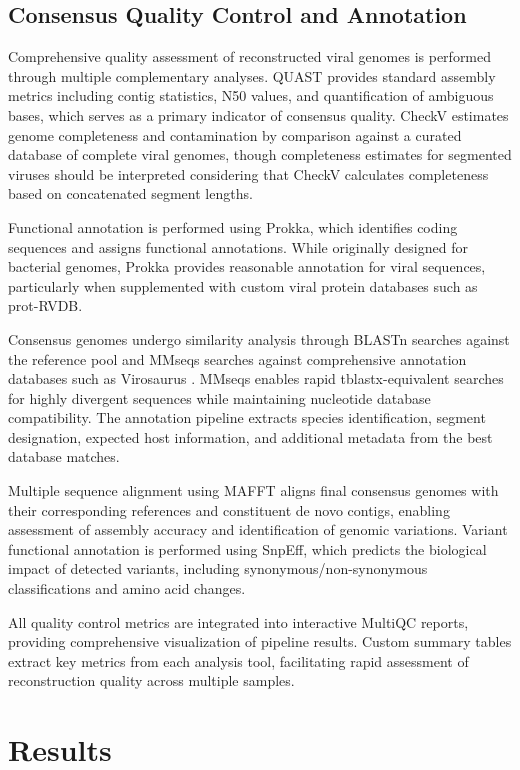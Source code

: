 \documentclass[unnumsec,webpdf,contemporary,large]{oup-authoring-template}%
\theoremstyle{thmstyleone}%
\theoremstyle{thmstyletwo}%
\theoremstyle{thmstylethree}%
\begin{document}
\subsection{Consensus Quality Control and Annotation}\label{subsec_qc}

Comprehensive quality assessment of reconstructed viral genomes is performed through multiple complementary analyses. QUAST provides standard assembly metrics including contig statistics, N50 values, and quantification of ambiguous bases, which serves as a primary indicator of consensus quality. CheckV \cite{Nayfach2021-wl} estimates genome completeness and contamination by comparison against a curated database of complete viral genomes, though completeness estimates for segmented viruses should be interpreted considering that CheckV calculates completeness based on concatenated segment lengths.

Functional annotation is performed using Prokka, which identifies coding sequences and assigns functional annotations. While originally designed for bacterial genomes, Prokka provides reasonable annotation for viral sequences, particularly when supplemented with custom viral protein databases such as prot-RVDB.

Consensus genomes undergo similarity analysis through BLASTn searches against the reference pool and MMseqs searches against comprehensive annotation databases such as Virosaurus \cite{Gleizes2020-rq}. MMseqs enables rapid tblastx-equivalent searches for highly divergent sequences while maintaining nucleotide database compatibility. The annotation pipeline extracts species identification, segment designation, expected host information, and additional metadata from the best database matches.

Multiple sequence alignment using MAFFT aligns final consensus genomes with their corresponding references and constituent de novo contigs, enabling assessment of assembly accuracy and identification of genomic variations. Variant functional annotation is performed using SnpEff, which predicts the biological impact of detected variants, including synonymous/non-synonymous classifications and amino acid changes.

All quality control metrics are integrated into interactive MultiQC reports, providing comprehensive visualization of pipeline results. Custom summary tables extract key metrics from each analysis tool, facilitating rapid assessment of reconstruction quality across multiple samples.

\section{Results}\label{sec3}
\end{document}
